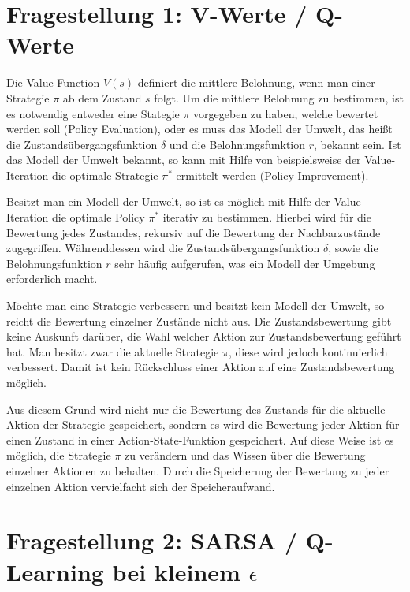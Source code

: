 \documentclass[10pt]{scrartcl}
\author{Pascal Jäger, Stefan Münchow, Armin Steudte,\\ Milena Rötting, Svend-Anjes Pahl, Carsten Noetzel, Oliver Steenbuck}
\title{\titletext}
\date{24.06.2012}
\begin{document}
\maketitle

\setcounter{tocdepth}{3}
\tableofcontents

\section{Fragestellung 1: V-Werte / Q-Werte}
Die Value-Function $V(s)$ definiert die mittlere Belohnung, wenn man einer Strategie $\pi$ ab dem Zustand $s$ folgt. Um die mittlere Belohnung zu bestimmen, ist es notwendig entweder eine Stategie $\pi$ vorgegeben zu haben, welche bewertet werden soll (Policy Evaluation), oder es muss das Modell der Umwelt, das heißt die Zustandsübergangsfunktion $\delta$ und die Belohnungsfunktion $r$, bekannt sein. Ist das Modell der Umwelt bekannt, so kann mit Hilfe von beispielsweise der Value-Iteration die optimale Strategie $\pi^*$ ermittelt werden (Policy Improvement).

Besitzt man ein Modell der Umwelt, so ist es möglich mit Hilfe der Value-Iteration die optimale Policy $\pi^*$ iterativ zu bestimmen. Hierbei wird für die Bewertung jedes Zustandes, rekursiv auf die Bewertung der Nachbarzustände zugegriffen. Währenddessen wird die Zustandsübergangsfunktion $\delta$, sowie die Belohnungsfunktion $r$ sehr häufig aufgerufen, was ein Modell der Umgebung erforderlich macht.

Möchte man eine Strategie verbessern und besitzt kein Modell der Umwelt, so reicht die Bewertung einzelner Zustände nicht aus. Die Zustandsbewertung gibt keine Auskunft darüber, die Wahl welcher Aktion zur Zustandsbewertung geführt hat. Man besitzt zwar die aktuelle Strategie $\pi$, diese wird jedoch kontinuierlich verbessert. Damit ist kein Rückschluss einer Aktion auf eine Zustandsbewertung möglich.

Aus diesem Grund wird nicht nur die Bewertung des Zustands für die aktuelle Aktion der Strategie gespeichert, sondern es wird die Bewertung jeder Aktion für einen Zustand in einer Action-State-Funktion gespeichert. Auf diese Weise ist es möglich, die Strategie $\pi$ zu verändern und das Wissen über die Bewertung einzelner Aktionen zu behalten. Durch die Speicherung der Bewertung zu jeder einzelnen Aktion vervielfacht sich der Speicheraufwand.

\section{Fragestellung 2: SARSA / Q-Learning bei kleinem $\epsilon$}
\end{document}
